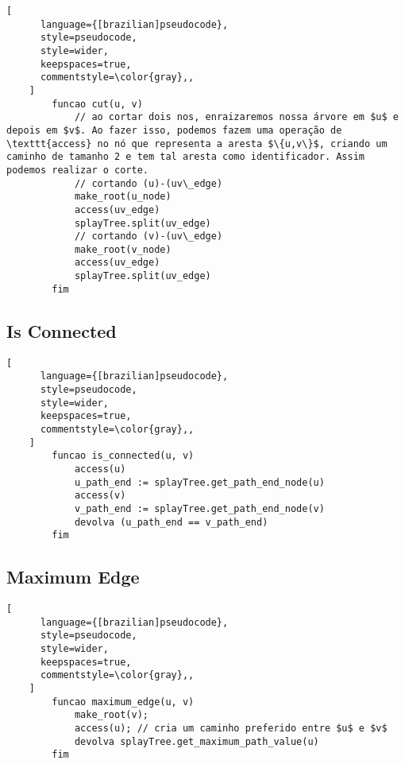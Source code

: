 \begin{programruledcaption}{\label{lct:cut}}
    \begin{lstlisting}[
      language={[brazilian]pseudocode},
      style=pseudocode,
      style=wider,
      keepspaces=true,
      commentstyle=\color{gray},,
    ]
        funcao cut(u, v)
            // ao cortar dois nos, enraizaremos nossa árvore em $u$ e depois em $v$. Ao fazer isso, podemos fazem uma operação de \texttt{access} no nó que representa a aresta $\{u,v\}$, criando um caminho de tamanho 2 e tem tal aresta como identificador. Assim podemos realizar o corte.
            // cortando (u)-(uv\_edge)
            make_root(u_node)
            access(uv_edge)
            splayTree.split(uv_edge)
            // cortando (v)-(uv\_edge)
            make_root(v_node)
            access(uv_edge)
            splayTree.split(uv_edge)
        fim
    \end{lstlisting}
\end{programruledcaption}


\subsection{Is Connected}
\label{subsection:lct-is-connected}

\begin{programruledcaption}{\label{lct:is-connected}}
    \begin{lstlisting}[
      language={[brazilian]pseudocode},
      style=pseudocode,
      style=wider,
      keepspaces=true,
      commentstyle=\color{gray},,
    ]
        funcao is_connected(u, v)
            access(u)
            u_path_end := splayTree.get_path_end_node(u)
            access(v)
            v_path_end := splayTree.get_path_end_node(v)
            devolva (u_path_end == v_path_end)
        fim
    \end{lstlisting}
\end{programruledcaption}


\subsection{Maximum Edge}
\label{subsection:lct-max-edge}

\begin{programruledcaption}{\label{lct:max-edge}}
    \begin{lstlisting}[
      language={[brazilian]pseudocode},
      style=pseudocode,
      style=wider,
      keepspaces=true,
      commentstyle=\color{gray},,
    ]
        funcao maximum_edge(u, v)
            make_root(v);
            access(u); // cria um caminho preferido entre $u$ e $v$
            devolva splayTree.get_maximum_path_value(u)
        fim
    \end{lstlisting}
\end{programruledcaption}

